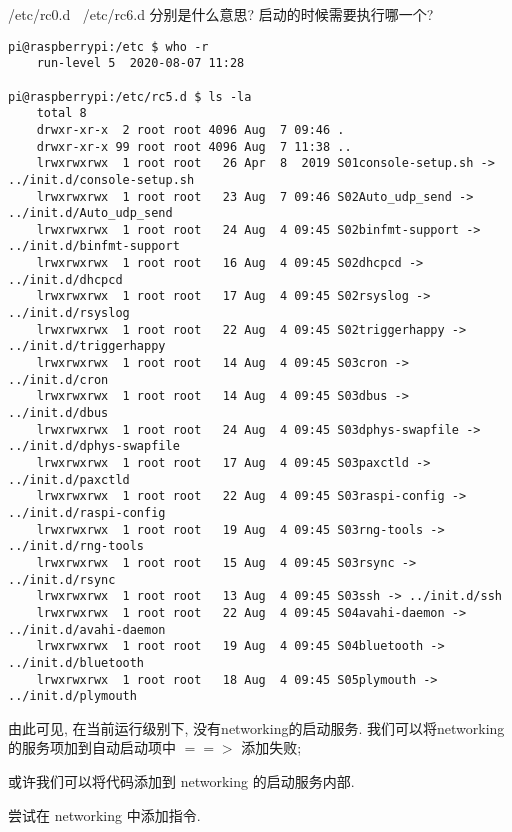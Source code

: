 /etc/rc0.d $~$ /etc/rc6.d 分别是什么意思? 启动的时候需要执行哪一个? 
\begin{lstlisting}[title=查看当前的运行级别]
pi@raspberrypi:/etc $ who -r 
    run-level 5  2020-08-07 11:28

pi@raspberrypi:/etc/rc5.d $ ls -la
    total 8
    drwxr-xr-x  2 root root 4096 Aug  7 09:46 .
    drwxr-xr-x 99 root root 4096 Aug  7 11:38 ..
    lrwxrwxrwx  1 root root   26 Apr  8  2019 S01console-setup.sh -> ../init.d/console-setup.sh
    lrwxrwxrwx  1 root root   23 Aug  7 09:46 S02Auto_udp_send -> ../init.d/Auto_udp_send
    lrwxrwxrwx  1 root root   24 Aug  4 09:45 S02binfmt-support -> ../init.d/binfmt-support
    lrwxrwxrwx  1 root root   16 Aug  4 09:45 S02dhcpcd -> ../init.d/dhcpcd
    lrwxrwxrwx  1 root root   17 Aug  4 09:45 S02rsyslog -> ../init.d/rsyslog
    lrwxrwxrwx  1 root root   22 Aug  4 09:45 S02triggerhappy -> ../init.d/triggerhappy
    lrwxrwxrwx  1 root root   14 Aug  4 09:45 S03cron -> ../init.d/cron
    lrwxrwxrwx  1 root root   14 Aug  4 09:45 S03dbus -> ../init.d/dbus
    lrwxrwxrwx  1 root root   24 Aug  4 09:45 S03dphys-swapfile -> ../init.d/dphys-swapfile
    lrwxrwxrwx  1 root root   17 Aug  4 09:45 S03paxctld -> ../init.d/paxctld
    lrwxrwxrwx  1 root root   22 Aug  4 09:45 S03raspi-config -> ../init.d/raspi-config
    lrwxrwxrwx  1 root root   19 Aug  4 09:45 S03rng-tools -> ../init.d/rng-tools
    lrwxrwxrwx  1 root root   15 Aug  4 09:45 S03rsync -> ../init.d/rsync
    lrwxrwxrwx  1 root root   13 Aug  4 09:45 S03ssh -> ../init.d/ssh
    lrwxrwxrwx  1 root root   22 Aug  4 09:45 S04avahi-daemon -> ../init.d/avahi-daemon
    lrwxrwxrwx  1 root root   19 Aug  4 09:45 S04bluetooth -> ../init.d/bluetooth
    lrwxrwxrwx  1 root root   18 Aug  4 09:45 S05plymouth -> ../init.d/plymouth
\end{lstlisting}
由此可见, 在当前运行级别下, 没有networking的启动服务. 我们可以将networking的服务项加到自动启动项中 $==>$ 添加失败; \par
或许我们可以将代码添加到 networking 的启动服务内部. 

\par 尝试在 networking 中添加指令. 

